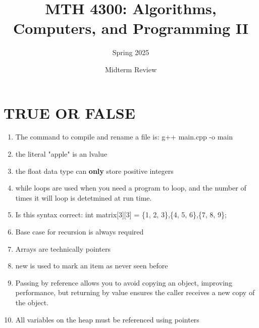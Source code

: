 \documentclass[a4paper]{article}
\title{MTH 4300: Algorithms, Computers, and Programming II}
\author{Spring 2025}
\date{Midterm Review}
\begin{document}
\maketitle


\section{TRUE OR FALSE}
\begin{enumerate}
    \item The command to compile and rename a file is: g++ main.cpp -o main
    \item the literal "apple" is an lvalue 
    \item the float data type can \textbf{only} store positive integers 
    \item while loops are used when you need a program to loop, 
          and the number of times it will loop is detetmined at run time.
    \item Is this syntax correct: int matrix[3][3] = \{1, 2, 3\},\{4, 5, 6\},\{7, 8, 9\};
    \item Base case for recursion is always required
    \item Arrays are technically pointers
    \item new is used to mark an item as never seen before
    \item Passing by reference allows you to avoid copying an object, improving performance, but returning
    by value ensures the caller receives a new copy of the object.
    \item All variables on the heap must be referenced using pointers
\end{enumerate}
\newpage
\end{document}
